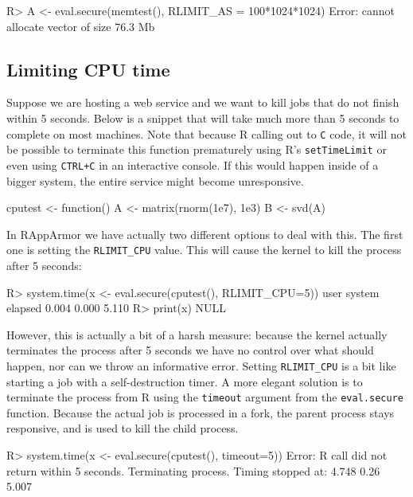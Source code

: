 \documentclass{jss}
\newcommand{\R}{\textsf{R}\xspace}
\begin{document}
\begin{appendices}
\begin{CodeChunk}
\begin{CodeInput}
R> A <- eval.secure(memtest(), RLIMIT_AS = 100*1024*1024)
Error: cannot allocate vector of size 76.3 Mb
\end{CodeInput}
\end{CodeChunk}


\subsection{Limiting CPU time}
\label{cputime}

Suppose we are hosting a web service and we want to kill jobs that do not finish
within 5 seconds. Below is a snippet that will take much more than 5 seconds to complete on most machines. Note that because \R calling out to \texttt{C} code, it will not be
possible to terminate this function prematurely using R's \texttt{setTimeLimit}
or even using \texttt{CTRL+C} in an interactive console. If this would happen
inside of a bigger system, the entire service might become unresponsive.

\begin{CodeChunk}
\begin{CodeInput}
cputest <- function(){
  A <- matrix(rnorm(1e7), 1e3)
  B <- svd(A)
}
\end{CodeInput}
\end{CodeChunk}
In RAppArmor we have actually two different options to deal with this. The first
one is setting the \texttt{RLIMIT\_CPU} value. This will cause the kernel to
kill the process after 5 seconds:
\begin{CodeChunk}
\begin{CodeInput}
R> system.time(x <- eval.secure(cputest(), RLIMIT_CPU=5))
   user  system elapsed 
  0.004   0.000   5.110 
R> print(x)
NULL
\end{CodeInput}
\end{CodeChunk}
However, this is actually a bit of a harsh measure: because the kernel actually
terminates the process after 5 seconds we have no control over what should
happen, nor can we throw an informative error. Setting \texttt{RLIMIT\_CPU} is
a bit like starting a job with a self-destruction timer. A more elegant
solution is to terminate the process from \R using the \texttt{timeout}
argument from the \texttt{eval.secure} function. Because the actual job is processed in a fork, the parent process stays responsive, and is used to kill the child process.
\begin{CodeChunk}
\begin{CodeInput}
R> system.time(x <- eval.secure(cputest(), timeout=5))
Error: R call did not return within 5 seconds. Terminating process.
Timing stopped at: 4.748 0.26 5.007
\end{CodeInput}
\end{CodeChunk}


\end{appendices}
\end{document}
